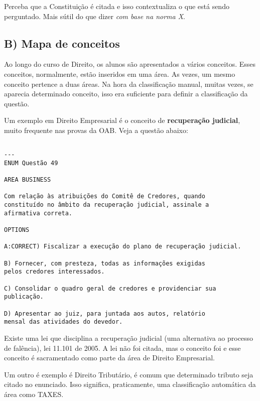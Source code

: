 \documentclass{article}
\begin{document}
Perceba que a Constituição é citada e isso contextualiza o que está sendo perguntado. Mais sútil do que dizer \textit{com base na norma X}.


\subsection*{B) Mapa de conceitos}

Ao longo do curso de Direito, os alunos são apresentados a vários conceitos. Esses conceitos, normalmente, estão inseridos em uma área. As vezes, um mesmo conceito pertence a duas áreas. Na hora da classificação manual, muitas vezes, se aparecia determinado conceito, isso era suficiente para definir a classificação da questão.

Um exemplo em Direito Empresarial é o conceito de  \textbf{recuperação judicial}, muito frequente nas provas da OAB. Veja a questão abaixo:

\begin{verbatim}

---
ENUM Questão 49 
  
AREA BUSINESS

Com relação às atribuições do Comitê de Credores, quando 
constituído no âmbito da recuperação judicial, assinale a 
afirmativa correta. 
 
OPTIONS

A:CORRECT) Fiscalizar a execução do plano de recuperação judicial. 

B) Fornecer, com presteza, todas as informações exigidas 
pelos credores interessados. 

C) Consolidar o quadro geral de credores e providenciar sua 
publicação. 

D) Apresentar ao juiz, para juntada aos autos, relatório 
mensal das atividades do devedor. 

\end{verbatim}

Existe uma lei que disciplina a recuperação judicial (uma alternativa ao processo de falência), lei 11.101 de 2005. A lei não foi citada, mas o conceito foi e esse conceito é sacramentado como parte da área de Direito Empresarial.

Um outro é exemplo é Direito Tributário, é comum que determinado tributo seja citado no enunciado. Isso significa, praticamente, uma classificação automática da área como TAXES.
\end{document}
